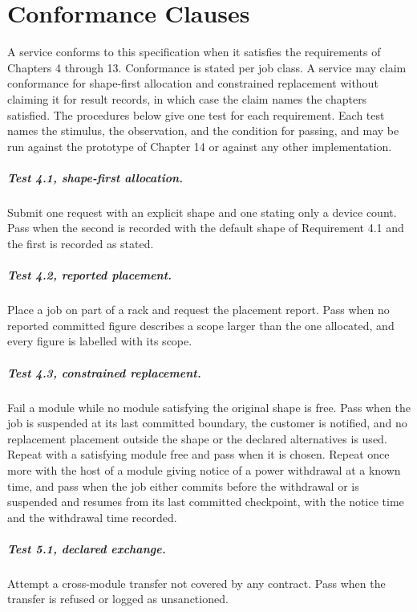 \documentclass[11pt,openany]{book}
\theoremstyle{remark}
\begin{document}
\appendix
\chapter{Conformance Clauses}

A service conforms to this specification when it satisfies the requirements of Chapters 4 through 13. Conformance is stated per job class. A service may claim conformance for shape-first allocation and constrained replacement without claiming it for result records, in which case the claim names the chapters satisfied. The procedures below give one test for each requirement. Each test names the stimulus, the observation, and the condition for passing, and may be run against the prototype of Chapter 14 or against any other implementation.

\paragraph{Test 4.1, shape-first allocation.} Submit one request with an explicit shape and one stating only a device count. Pass when the second is recorded with the default shape of Requirement 4.1 and the first is recorded as stated.

\paragraph{Test 4.2, reported placement.} Place a job on part of a rack and request the placement report. Pass when no reported committed figure describes a scope larger than the one allocated, and every figure is labelled with its scope.

\paragraph{Test 4.3, constrained replacement.} Fail a module while no module satisfying the original shape is free. Pass when the job is suspended at its last committed boundary, the customer is notified, and no replacement placement outside the shape or the declared alternatives is used. Repeat with a satisfying module free and pass when it is chosen. Repeat once more with the host of a module giving notice of a power withdrawal at a known time, and pass when the job either commits before the withdrawal or is suspended and resumes from its last committed checkpoint, with the notice time and the withdrawal time recorded.

\paragraph{Test 5.1, declared exchange.} Attempt a cross-module transfer not covered by any contract. Pass when the transfer is refused or logged as unsanctioned.
\end{document}
